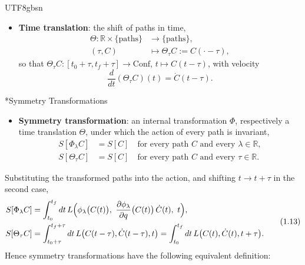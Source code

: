 \documentclass[11pt,a4paper,oneside]{report}
\makeatletter
\newcommand\topic{\@startsection{paragraph}{4}{\z@}{-1.7ex plus -.3ex}{.5ex}{\normalfont\normalsize\bfseries\itshape\boldmath}*}
\makeatother
\begin{document}
\begin{CJK*}{UTF8}{gbsn}
\begin{itemize}
\item \textbf{\boldmath Time translation}: the shift of paths in time,
\begin{equation*}
\begin{aligned}
\Theta:\mathbb R\times\{\text{paths}\}&\to\{\text{paths}\},\\
(\tau,C)&\mapsto\Theta_\tau C:=C(\cdot-\tau),
\end{aligned}
\tag{1.10}\label{eq:1.10}
\end{equation*}
so that $\Theta_\tau C:[t_0+\tau,t_f+\tau]\to\mathrm{Conf}$, $t\mapsto C(t-\tau)$, with velocity
\begin{equation*}
\frac{d}{dt}(\Theta_\tau C)(t)=\dot C(t-\tau).
\tag{1.11}\label{eq:1.11}
\end{equation*}
\end{itemize}


\topic{Symmetry Transformations}
\begin{itemize}


\item \textbf{\boldmath Symmetry transformation}: an internal transformation $\Phi$, respectively a time translation $\Theta$, under which the action of every path is invariant,
\begin{equation*}
{\displaystyle 
\begin{aligned}
S[\Phi_\lambda C]&=S[C]\quad\text{for every path }C\text{ and every }\lambda\in\mathbb R,\\
S[\Theta_\tau C]&=S[C]\quad\text{for every path }C\text{ and every }\tau\in\mathbb R.
\end{aligned}}
\tag{1.12}\label{eq:1.12}
\end{equation*}
\end{itemize}

Substituting the transformed paths into the action, and shifting $t\to t+\tau$ in the second case,
\begin{equation*}
\begin{aligned}
S[\Phi_\lambda C]&=\int_{t_0}^{t_f}dt\,L\Bigl(\phi_\lambda\bigl(C(t)\bigr),\ \frac{\partial\phi_\lambda}{\partial q}\bigl(C(t)\bigr)\,\dot C(t),\ t\Bigr),\\
S[\Theta_\tau C]&=\int_{t_0+\tau}^{t_f+\tau}dt\,L\bigl(C(t-\tau),\dot C(t-\tau),t\bigr)=\int_{t_0}^{t_f}dt\,L\bigl(C(t),\dot C(t),t+\tau\bigr).
\end{aligned}
\tag{1.13}\label{eq:1.13}
\end{equation*}
Hence symmetry transformations have the following equivalent definition:


\end{CJK*}
\end{document}

